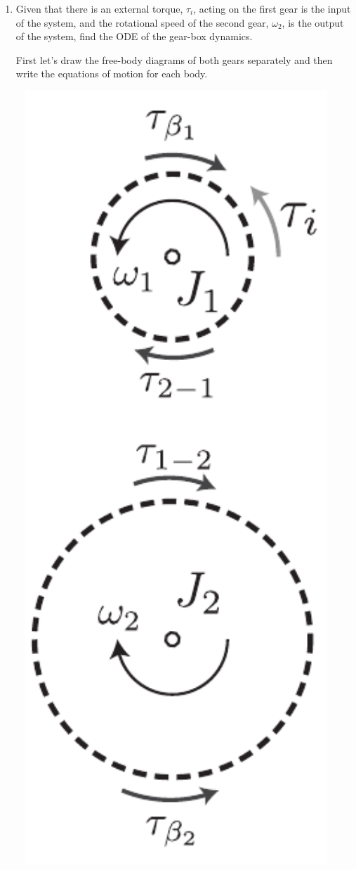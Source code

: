 \documentclass[twoside]{article}
\begin{document}
\begin{enumerate}

\item Given that there is an external torque, $\tau_i$, acting on the first gear is the input of the system, and the rotational speed of the
second gear, $\omega_2$, is the output of the system, find the ODE of the gear-box dynamics. 

First let's draw the free-body diagrams of both gears separately and then write the equations of motion for each body. 


  \begin{minipage}[h]{0.35\linewidth}
    \begin{center}
      \includegraphics[width=0.95\textwidth]{ex2_sol}

\end{center}
\end{minipage}
\end{enumerate}
\end{document}
